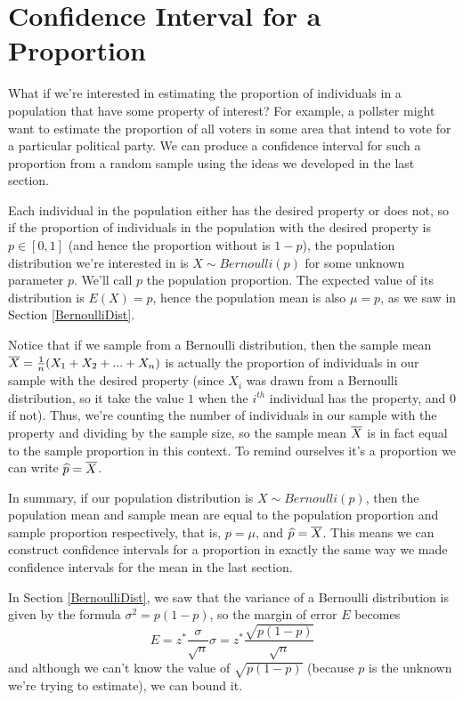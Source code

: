 \section{Confidence Interval for a Proportion}

What if we're interested in estimating the proportion of individuals in a population that have some property of interest? For example, a pollster might want to estimate the proportion of all voters in some area that intend to vote for a particular political party. We can produce a confidence interval for such a proportion from a random sample using the ideas we developed in the last section.
\par
Each individual in the population either has the desired property or does not, so if the proportion of individuals in the population with the desired property is $p \in [0,1]$ (and hence the proportion without is $1-p$), the population distribution we're interested in is $X \sim Bernoulli(p)$ for some unknown parameter $p$. We'll call $p$ the population proportion. The expected value of its distribution is $E(X) = p$, hence the population mean is also $\mu = p$, as we saw in Section \ref{BernoulliDist}.
\par
Notice that if we sample from a Bernoulli distribution, then the sample mean ${\overline{X}} = \frac{1}{n}(X_1+X_2+...+X_n)$ is actually the proportion of individuals in our sample with the desired property (since $X_i$ was drawn from a Bernoulli distribution, so it take the value $1$ when the $i^{th}$ individual has the property, and $0$ if not). Thus, we're counting the number of individuals in our sample with the property and dividing by the sample size, so the sample mean ${\overline{X}}$ is in fact equal to the sample proportion in this context. To remind ourselves it's a proportion we can write $\widehat{p} = {\overline{X}}$.
\par
In summary, if our population distribution is $X \sim Bernoulli(p)$, then the population mean and sample mean are equal to the population proportion and sample proportion respectively, that is, $p = \mu$, and $\widehat{p}={\overline{X}}$. This means we can construct confidence intervals for a proportion in exactly the same way we made confidence intervals for the mean in the last section.
\par
In Section \ref{BernoulliDist}, we saw that the variance of a Bernoulli distribution is given by the formula $\sigma^2 = p(1-p)$, so the margin of error $E$ becomes
$$E = z^*  \frac{\sigma}{\sqrt{n}}\sigma = z^*  \frac{\sqrt{p(1-p)}}{\sqrt{n}}$$
and although we can't know the value of $\sqrt{p(1-p)}$ (because $p$ is the unknown we're trying to estimate), we can bound it.
